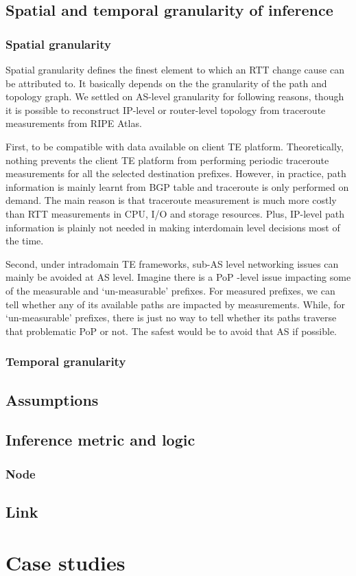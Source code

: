 \subsection{Spatial and temporal granularity of inference}
\subsubsection{Spatial granularity}
Spatial granularity defines the finest element to which an RTT change cause can be attributed to.
It basically depends on the the granularity of the path and topology graph. We settled on AS-level granularity for following reasons, though it is possible to reconstruct IP-level or router-level topology\cite{Donnet2007} from traceroute measurements from RIPE Atlas.

First, to be compatible with data available on client TE platform. Theoretically, nothing prevents the client TE platform from performing periodic traceroute measurements for all the selected destination prefixes. However, in practice, path information is mainly learnt from BGP table and traceroute is only performed on demand. The main reason is that traceroute measurement is much  more costly than RTT measurements in CPU, I/O and storage resources. Plus, IP-level path information is plainly not needed in making interdomain level decisions most of the time.

Second, under intradomain TE frameworks, sub-AS level networking issues can mainly be avoided at AS level. Imagine there is a \acf{PoP} -level issue impacting some of the measurable and `un-measurable' prefixes. For measured prefixes, we can tell whether any of its available paths are impacted by measurements. While, for `un-measurable' prefixes, there is just no way to tell whether its paths traverse that problematic PoP or not. The safest would be to avoid that AS if possible.

\subsubsection{Temporal granularity}


\subsection{Assumptions}

\subsection{Inference metric and logic}
\subsubsection{Node}
\subsection{Link}

\section{Case studies}
